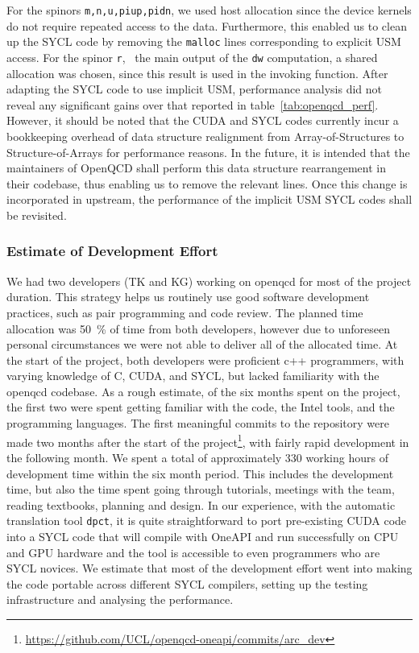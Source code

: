 \documentclass[../main]{subfiles}
\begin{document}
For the spinors \texttt{m,n,u,piup,pidn}, we used host allocation since the device kernels do not require repeated access to the data.
Furthermore, this enabled us to clean up the SYCL code by removing the \texttt{malloc} lines corresponding to explicit USM access.
For the spinor \texttt{r}, \ie~the main output of the \texttt{dw} computation, a shared allocation was chosen, since this result is used in the invoking function.
After adapting the SYCL code to use implicit USM, performance analysis did not reveal any significant gains over that reported in table~\ref{tab:openqcd_perf}.
However, it should be noted that the CUDA and SYCL codes currently incur a bookkeeping overhead of data structure realignment from Array-of-Structures to Structure-of-Arrays for performance reasons.
In the future, it is intended that the maintainers of OpenQCD shall perform this data structure rearrangement in their codebase, thus enabling us to remove the relevant lines.
Once this change is incorporated in upstream, the performance of the implicit USM SYCL codes shall be revisited.

\subsubsection{Estimate of Development Effort}\label{sec:openqcd_personhours}

We had two developers (TK and KG) working on openqcd for most of the project duration.
This strategy helps us routinely use good software development practices, such as pair programming and code review.
The planned time allocation was 50~\% of time from both developers, however due to unforeseen personal circumstances we were not able to deliver all of the allocated time.
At the start of the project, both developers were proficient c++ programmers, with varying knowledge of C, CUDA, and SYCL, but lacked familiarity with the openqcd codebase.
As a rough estimate, of the six months spent on the project, the first two were spent getting familiar with the code, the Intel tools, and the programming languages.
The first meaningful commits to the repository were made two months after the start of the project\footnote{\url{https://github.com/UCL/openqcd-oneapi/commits/arc_dev}}, with fairly rapid development in the following month.
We spent a total of approximately 330 working hours of development time within the six month period.
This includes the development time, but also the time spent going through tutorials, meetings with the team, reading textbooks, planning and design.
In our experience, with the automatic translation tool \texttt{dpct}, it is quite straightforward to port pre-existing CUDA code into a SYCL code that will compile with OneAPI and run successfully on CPU and GPU hardware and the tool is accessible to even programmers who are SYCL novices.
We estimate that most of the development effort went into making the code portable across different SYCL compilers, setting up the testing infrastructure and analysing the performance.
\end{document}
